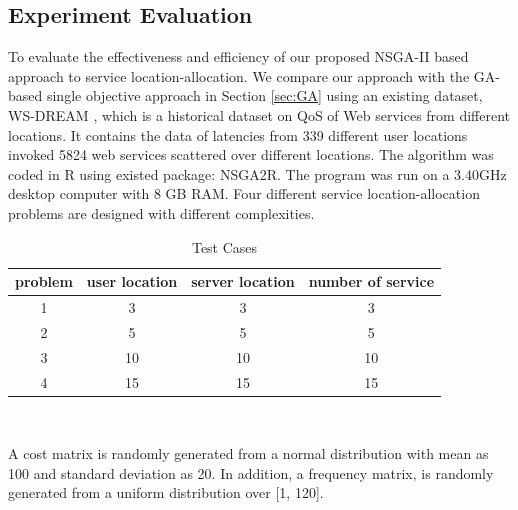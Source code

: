 \documentclass{llncs}
\begin{document}
\begin{flushleft}
\begin{flushleft}
\section{Experiment Evaluation}
\label{sec:experiment}
To evaluate the effectiveness and efficiency of our proposed NSGA-II based approach to service location-allocation. We compare our approach with the GA-based single objective approach in Section \ref{sec:GA}
using an existing dataset, WS-DREAM \cite{6076756} \cite{5552800}, which is a historical dataset on QoS of Web services from different locations. It contains the data of latencies
from 339 different user locations invoked 5824 web services scattered over different locations.
The algorithm was coded in R \cite{Morandat:2012:EDR:2367163.2367172} using existed package: NSGA2R. The program was run on a 3.40GHz 
desktop computer with 8 GB RAM. Four different service location-allocation problems are designed with different complexities.
\begin{table}[h]
{\centering
	\caption{Test Cases}
	\begin{tabular}{|c|c|c|c|}
		\hline
		\multicolumn{1}{|l|}{problem} & \multicolumn{1}{l|}{user location} & \multicolumn{1}{l|}{server location} & \multicolumn{1}{l|}{number of service} \\\hline
		1                             & 3                                  & 3                                    & 3                                      \\\hline
		2                             & 5                                  & 5                                    & 5                                      \\\hline
		3                             & 10                                 & 10                                   & 10                                     \\\hline
		4                             & 15                                 & 15                                   & 15                                    \\
		\hline
	\end{tabular}
\\}
\end{table}
	A cost matrix is randomly generated from a normal distribution with mean as 100 and standard deviation as 20. In addition, a frequency matrix, is randomly generated from a uniform distribution over [1, 120].


\end{flushleft}
\end{flushleft}
\end{document}
